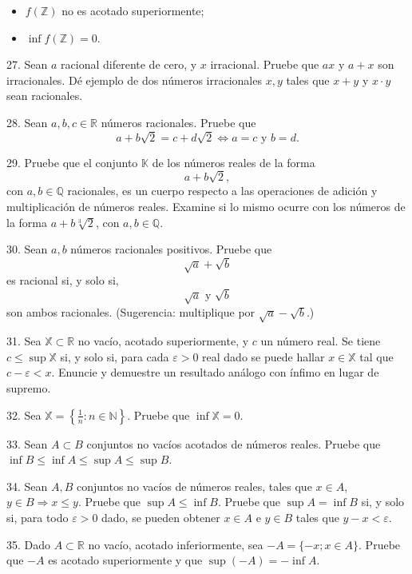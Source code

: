 \documentclass[12pt,oneside]{book}
\begin{document}
\begin{itemize}
    \item [(i)] \( f(\mathbb{Z}) \) no es acotado superiormente;
    \item [(ii)] \( \inf f(\mathbb{Z}) = 0 \).
\end{itemize}

27. Sean \( a \) racional diferente de cero, y \( x \) irracional. Pruebe que \( ax \) y \( a + x \) son irracionales. Dé ejemplo de dos números irracionales \( x, y \) tales que \( x + y \) y \( x \cdot y \) sean racionales.

28. Sean \(a, b, c \in \mathbb{R}\) números racionales. Pruebe que
\[ a + b\sqrt{2} = c + d\sqrt{2} \Leftrightarrow a = c \text{ y } b = d. \]

29. Pruebe que el conjunto \(\mathbb{K}\) de los números reales de la forma
\[ a + b\sqrt{2}, \]
con \(a, b \in \mathbb{Q}\) racionales, es un cuerpo respecto a las operaciones de adición y multiplicación de números reales. Examine si lo mismo ocurre con los números de la forma \(a + b\sqrt[3]{2}\), con \(a, b \in \mathbb{Q}\).

30. Sean \(a, b\) números racionales positivos. Pruebe que
\[ \sqrt{a} + \sqrt{b} \]
es racional si, y solo si,
\[ \sqrt{a} \text{ y } \sqrt{b} \]
son ambos racionales. (Sugerencia: multiplique por \(\sqrt{a} - \sqrt{b}\).)

31. Sea \(\mathbb{X} \subset \mathbb{R}\) no vacío, acotado superiormente, y \(c\) un número real. Se tiene \(c \leq \sup \mathbb{X}\) si, y solo si, para cada \(\varepsilon > 0\) real dado se puede hallar \(x \in \mathbb{X}\) tal que \(c - \varepsilon < x\). Enuncie y demuestre un resultado análogo con ínfimo en lugar de supremo.

32. Sea \(\mathbb{X} = \left\{ \frac{1}{n} : n \in \mathbb{N} \right\}\). Pruebe que \(\inf \mathbb{X} = 0\).

33. Sean \(A \subset B\) conjuntos no vacíos acotados de números reales. Pruebe que \(\inf B \leq \inf A \leq \sup A \leq \sup B\).

34. Sean \(A, B\) conjuntos no vacíos de números reales, tales que \(x \in A\), \(y \in B \Rightarrow x \leq y\). Pruebe que \(\sup A \leq \inf B\). Pruebe que \(\sup A = \inf B\) si, y solo si, para todo \(\varepsilon > 0\) dado, se pueden obtener \(x \in A\) e \(y \in B\) tales que \(y - x < \varepsilon\).

35. Dado \(A \subset \mathbb{R}\) no vacío, acotado inferiormente, sea \(-A = \{-x; x \in A\}\). Pruebe que \(-A\) es acotado superiormente y que \(\sup(-A) = -\inf A\).
\end{document}
